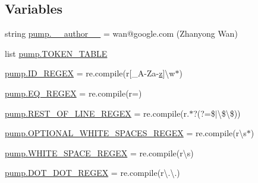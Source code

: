 \subsection*{Variables}
\begin{DoxyCompactItemize}
\item 
string \mbox{\hyperlink{namespacepump_ab99a065546038823261c774117df0798}{pump.\+\_\+\+\_\+author\+\_\+\+\_\+}} = \textquotesingle{}wan@google.\+com (Zhanyong Wan)\textquotesingle{}
\item 
list \mbox{\hyperlink{namespacepump_a132b35d1104c7f479aa21c345f413477}{pump.\+T\+O\+K\+E\+N\+\_\+\+T\+A\+B\+LE}}
\item 
\mbox{\hyperlink{namespacepump_a8e008923b6c378b8d3df611fb07d6dda}{pump.\+I\+D\+\_\+\+R\+E\+G\+EX}} = re.\+compile(r\textquotesingle{}\mbox{[}\+\_\+A-\/Za-\/\mbox{\hyperlink{_obj__test_2lib_2googletest-master_2googlemock_2test_2gmock-matchers__test_8cc_a196ff6a287f53f758b1506f21269fc77}{z}}\mbox{]}\textbackslash{}w$\ast$\textquotesingle{})
\item 
\mbox{\hyperlink{namespacepump_a6397ed9bab62b5c6f60a6626f6b287e0}{pump.\+E\+Q\+\_\+\+R\+E\+G\+EX}} = re.\+compile(r\textquotesingle{}=\textquotesingle{})
\item 
\mbox{\hyperlink{namespacepump_a4c1f68b32fcb8366051b574cf2e6aef1}{pump.\+R\+E\+S\+T\+\_\+\+O\+F\+\_\+\+L\+I\+N\+E\+\_\+\+R\+E\+G\+EX}} = re.\+compile(r\textquotesingle{}.$\ast$?(?=\$$\vert$\textbackslash{}\$\textbackslash{}\$)\textquotesingle{})
\item 
\mbox{\hyperlink{namespacepump_a81f03eaffd2c0f4c6a453a0b179e51ca}{pump.\+O\+P\+T\+I\+O\+N\+A\+L\+\_\+\+W\+H\+I\+T\+E\+\_\+\+S\+P\+A\+C\+E\+S\+\_\+\+R\+E\+G\+EX}} = re.\+compile(r\textquotesingle{}\textbackslash{}s$\ast$\textquotesingle{})
\item 
\mbox{\hyperlink{namespacepump_a4ab1be351870f785a72d324bf56c8316}{pump.\+W\+H\+I\+T\+E\+\_\+\+S\+P\+A\+C\+E\+\_\+\+R\+E\+G\+EX}} = re.\+compile(r\textquotesingle{}\textbackslash{}s\textquotesingle{})
\item 
\mbox{\hyperlink{namespacepump_a45644ad738e584ec754f6d9f45fe693c}{pump.\+D\+O\+T\+\_\+\+D\+O\+T\+\_\+\+R\+E\+G\+EX}} = re.\+compile(r\textquotesingle{}\textbackslash{}.\textbackslash{}.\textquotesingle{})
\end{DoxyCompactItemize}
